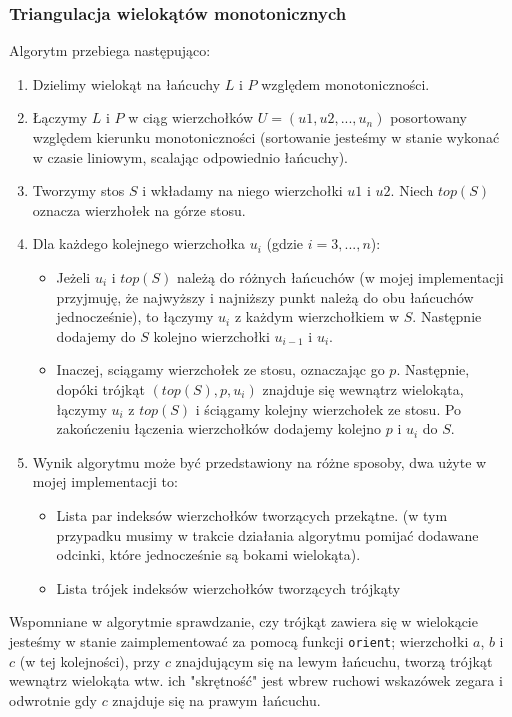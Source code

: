 \documentclass[11pt,a4paper]{article}
\begin{document}
\subsubsection{Triangulacja wielokątów monotonicznych}
Algorytm przebiega następująco:
\begin{enumerate}
    \item Dzielimy wielokąt na łańcuchy $L$ i $P$ względem
    monotoniczności.
    \item Łączymy $L$ i $P$ w ciąg wierzchołków $U = (u1, u2, ..., u_n)$ posortowany
    względem kierunku monotoniczności (sortowanie jesteśmy w stanie
    wykonać w czasie liniowym, scalając odpowiednio łańcuchy).
    \item Tworzymy stos $S$ i wkładamy na niego wierzchołki $u1$ i $u2$.
    Niech $top(S)$ oznacza wierzhołek na górze stosu.
    \item Dla każdego kolejnego wierzchołka $u_i$ (gdzie $i = 3,...,n$):
    \begin{itemize}
        \item Jeżeli $u_i$ i $top(S)$ należą do różnych łańcuchów
        (w mojej implementacji przyjmuję, że najwyższy i najniższy punkt
        należą do obu łańcuchów jednocześnie),
        to łączymy $u_i$ z każdym wierzchołkiem w $S$. Następnie
        dodajemy do $S$ kolejno wierzchołki $u_{i - 1}$ i $u_i$.
        \item Inaczej, sciągamy wierzchołek ze stosu, oznaczając go $p$.
        Następnie, dopóki trójkąt $(top(S), p, u_i)$ znajduje się wewnątrz wielokąta,
        łączymy $u_i$ z $top(S)$ i ściągamy kolejny wierzchołek ze stosu.
        Po zakończeniu łączenia wierzchołków dodajemy kolejno $p$ i $u_i$ do $S$.
    \end{itemize}
    \item Wynik algorytmu może być przedstawiony na różne sposoby, dwa użyte
    w mojej implementacji to:
    \begin{itemize}
        \item Lista par indeksów wierzchołków tworzących przekątne.
        (w tym przypadku musimy w trakcie działania algorytmu pomijać dodawane
        odcinki, które jednocześnie są bokami wielokąta).
        \item Lista trójek indeksów wierzchołków tworzących trójkąty
    \end{itemize}
\end{enumerate}
Wspomniane w algorytmie sprawdzanie, czy trójkąt zawiera się w wielokącie
jesteśmy w stanie zaimplementować za pomocą funkcji \verb|orient|; 
wierzchołki $a$, $b$ i $c$ (w tej kolejności), przy $c$ znajdującym 
się na lewym łańcuchu, tworzą trójkąt wewnątrz wielokąta wtw.
ich "skrętność" jest wbrew ruchowi wskazówek zegara i odwrotnie gdy
$c$ znajduje się na prawym łańcuchu.\\
\end{document}
